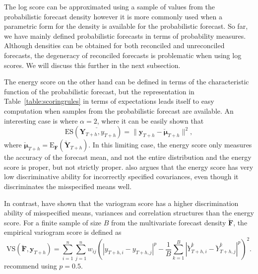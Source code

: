\documentclass[a4paper, 11pt]{article}
\def\E{\text{E}}
\theoremstyle{theo}
\theoremstyle{definition}
\begin{document}
The log score can be approximated using a sample of values from the probabilistic forecast density \citep{Jordan2017} however it is more commonly used when a parametric form for the density is available for the probabilistic forecast.  So far, we have mainly defined probabilistic forecasts in terms of probability measures.  Although densities can be obtained for both reconciled and unreconciled forecasts, the degeneracy of reconciled forecasts is problematic when using log scores. We will discuss this further in the next subsection.

The energy score on the other hand can be defined in terms of the characteristic function of the probabilistic forecast, but the representation in Table~\ref{table:scoringrules} in terms of expectations leads itself to easy computation when samples from the probabilistic forecast are available. 
An interesting case is where $\alpha=2$, where it can be easily shown that
\begin{equation} \label{eq:(5.1)}
\text{ES}(\breve{\bm{Y}_{T+h},y_{T+h}}) = \|\bm{y}_{T+h}-\breve{\bm{\mu}}_{T+h}\|^2,
\end{equation}
where $\breve{\bm{\mu}}_{T+h} =\E_{\bm{F}}(\breve{\bm{Y}}_{T+h}) $. In this limiting case, the energy score only measures the accuracy of the forecast mean, and not the entire distribution and the energy score is proper, but not strictly proper. \citet{Pinson2013a} also argues that the energy score has very low discriminative ability for incorrectly specified covariances, even though it discriminates the misspecified means well.

In contrast, \citet{SCHEUERER2015} have shown that the variogram score has a higher discrimination ability of misspecified means, variances and correlation structures than the energy score. For a finite sample of size $B$ from the multivariate forecast density $\breve{\bm{F}}$, the empirical variogram score is defined as
\begin{equation}
\text{VS}(\breve{\bm{F}}, \bm{y}_{T+h}) = \displaystyle\sum_{i=1}^{n}\displaystyle\sum_{j=1}^{n}w_{ij}\left(|y_{T+h,i} - y_{T+h,j}|^p - \frac{1}{B} \displaystyle\sum_{k=1}^{B} |\breve{Y}^k_{T+h,i}-\breve{Y}^k_{T+h,j}|^p\right)^2.
\end{equation}
\citet{SCHEUERER2015} recommend using $p=0.5$. 


\end{document}
